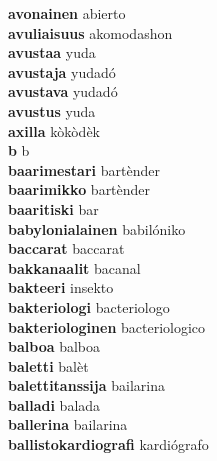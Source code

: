 \textbf{avonainen } abierto \\
\textbf{avuliaisuus } akomodashon \\
\textbf{avustaa } yuda \\
\textbf{avustaja } yudadó \\
\textbf{avustava } yudadó \\
\textbf{avustus } yuda \\
\textbf{axilla } kòkòdèk \\
\textbf{b } b \\
\textbf{baarimestari } bartènder \\
\textbf{baarimikko } bartènder \\
\textbf{baaritiski } bar \\
\textbf{babylonialainen } babilóniko \\
\textbf{baccarat } baccarat \\
\textbf{bakkanaalit } bacanal \\
\textbf{bakteeri } insekto \\
\textbf{bakteriologi } bacteriologo \\
\textbf{bakteriologinen } bacteriologico \\
\textbf{balboa } balboa \\
\textbf{baletti } balèt \\
\textbf{balettitanssija } bailarina \\
\textbf{balladi } balada \\
\textbf{ballerina } bailarina \\
\textbf{ballistokardiografi } kardiógrafo \\
